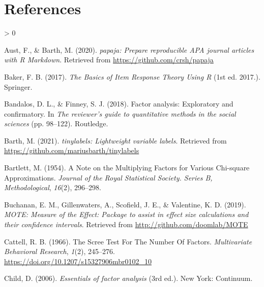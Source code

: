 \documentclass[
  english,
  man]{apa6}
\newlength{\cslhangindent}
\newenvironment{CSLReferences}[2] %
 {%
  \setlength{\parindent}{0pt}
  \ifodd #1 \everypar{\setlength{\hangindent}{\cslhangindent}}\ignorespaces\fi
  \ifnum #2 > 0
  \setlength{\parskip}{#2\baselineskip}
  \fi
 }%
 {}
\begin{document}
\newpage

\hypertarget{references}{%
\section{References}\label{references}}

\begingroup
\setlength{\parindent}{-0.5in}
\setlength{\leftskip}{0.5in}

\hypertarget{refs}{}
\begin{CSLReferences}{1}{0}
\leavevmode\hypertarget{ref-R-papaja}{}%
Aust, F., \& Barth, M. (2020). \emph{{papaja}: {Prepare} reproducible {APA} journal articles with {R Markdown}}. Retrieved from \url{https://github.com/crsh/papaja}

\leavevmode\hypertarget{ref-bakerBasicsItemResponse2017}{}%
Baker, F. B. (2017). \emph{The {Basics} of {Item Response Theory Using R}} (1st ed. 2017.). {Springer}.

\leavevmode\hypertarget{ref-bandalosFactorAnalysisExploratory2018}{}%
Bandalos, D. L., \& Finney, S. J. (2018). Factor analysis: {Exploratory} and confirmatory. In \emph{The reviewer's guide to quantitative methods in the social sciences} (pp. 98--122). {Routledge}.

\leavevmode\hypertarget{ref-R-tinylabels}{}%
Barth, M. (2021). \emph{{tinylabels}: Lightweight variable labels}. Retrieved from \url{https://github.com/mariusbarth/tinylabels}

\leavevmode\hypertarget{ref-bartlettNoteMultiplyingFactors1954}{}%
Bartlett, M. (1954). A {Note} on the {Multiplying Factors} for {Various Chi}-square {Approximations}. \emph{Journal of the Royal Statistical Society. Series B, Methodological}, \emph{16}(2), 296--298.

\leavevmode\hypertarget{ref-R-MOTE}{}%
Buchanan, E. M., Gillenwaters, A., Scofield, J. E., \& Valentine, K. D. (2019). \emph{{MOTE: Measure of the Effect}: Package to assist in effect size calculations and their confidence intervals}. Retrieved from \url{http://github.com/doomlab/MOTE}

\leavevmode\hypertarget{ref-cattellScreeTestNumber1966}{}%
Cattell, R. B. (1966). The {Scree Test For The Number Of Factors}. \emph{Multivariate Behavioral Research}, \emph{1}(2), 245--276. \url{https://doi.org/10.1207/s15327906mbr0102_10}

\leavevmode\hypertarget{ref-childEssentialsFactorAnalysis2006}{}%
Child, D. (2006). \emph{Essentials of factor analysis} (3rd ed.). {New York: Continuum}.


\end{CSLReferences}
\end{document}
